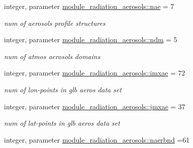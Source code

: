 \begin{DoxyCompactItemize}
\mbox{\label{group__module__radiation__aerosols_ga45121ca4dcb3194e8afb4090fa810657}} 
integer, parameter \hyperlink{group__module__radiation__aerosols_ga45121ca4dcb3194e8afb4090fa810657}{module\+\_\+radiation\+\_\+aerosols\+::nae} = 7
\begin{DoxyCompactList}\small\item\em num of aerosols profile structures \end{DoxyCompactList}\item 
\mbox{\label{group__module__radiation__aerosols_gae77b22f76f193cef19b6e6c3ee8e0773}} 
integer, parameter \hyperlink{group__module__radiation__aerosols_gae77b22f76f193cef19b6e6c3ee8e0773}{module\+\_\+radiation\+\_\+aerosols\+::ndm} = 5
\begin{DoxyCompactList}\small\item\em num of atmos aerosols domains \end{DoxyCompactList}\item 
\mbox{\label{group__module__radiation__aerosols_ga52cda855a397136f75768d205292ddbb}} 
integer, parameter \hyperlink{group__module__radiation__aerosols_ga52cda855a397136f75768d205292ddbb}{module\+\_\+radiation\+\_\+aerosols\+::imxae} = 72
\begin{DoxyCompactList}\small\item\em num of lon-\/points in glb aeros data set \end{DoxyCompactList}\item 
\mbox{\label{group__module__radiation__aerosols_gafdfdd058364062349b02cec9c712ea80}} 
integer, parameter \hyperlink{group__module__radiation__aerosols_gafdfdd058364062349b02cec9c712ea80}{module\+\_\+radiation\+\_\+aerosols\+::jmxae} = 37
\begin{DoxyCompactList}\small\item\em num of lat-\/points in glb aeros data set \end{DoxyCompactList}\item 
\mbox{\label{group__module__radiation__aerosols_gae8ffb66e7e617f045663ce2732743b4a}} 
integer, parameter \hyperlink{group__module__radiation__aerosols_gae8ffb66e7e617f045663ce2732743b4a}{module\+\_\+radiation\+\_\+aerosols\+::naerbnd} =61

\end{DoxyCompactItemize}
